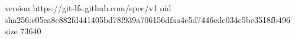 version https://git-lfs.github.com/spec/v1
oid sha256:c05ea8e882fd441405bd78f939a706156dfaa4c5d7446ede034c5be3518fb496
size 73640
